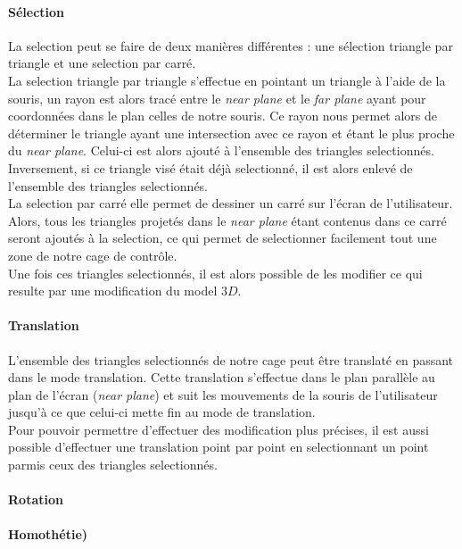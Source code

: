 \documentclass[10pt,a4paper]{article}
\begin{document}
\paragraph{Sélection}La selection peut se faire de deux manières différentes : une sélection triangle par triangle et une selection par carré.\\
La selection triangle par triangle s'effectue en pointant un triangle à l'aide de la souris, un rayon est alors tracé entre le \textit{near plane} et le \textit{far plane} ayant pour coordonnées dans le plan celles de notre souris. Ce rayon nous permet alors de déterminer le triangle ayant une intersection avec ce rayon et étant le plus proche du \textit{near plane}. Celui-ci est alors ajouté à l'ensemble des triangles selectionnés. Inversement, si ce triangle visé était déjà selectionné, il est alors enlevé de l'ensemble des triangles selectionnés.\\
La selection par carré elle permet de dessiner un carré sur l'écran de l'utilisateur. Alors, tous les triangles projetés dans le \textit{near plane} étant contenus dans ce carré seront ajoutés à la selection, ce qui permet de selectionner facilement tout une zone de notre cage de contrôle.\\
Une fois ces triangles selectionnés, il est alors possible de les modifier ce qui resulte par une modification du model $3D$.

\paragraph{Translation}L'ensemble des triangles selectionnés de notre cage peut être translaté en passant dans le mode translation. Cette translation s'effectue dans le plan parallèle au plan de l'écran (\textit{near plane}) et suit les mouvements de la souris de l'utilisateur jusqu'à ce que celui-ci mette fin au mode de translation.\\
Pour pouvoir permettre d'effectuer des modification plus précises, il est aussi possible d'effectuer une translation point par point en selectionnant un point parmis ceux des triangles selectionnés. 

\paragraph{Rotation}

\paragraph{Homothétie)}
\end{document}
